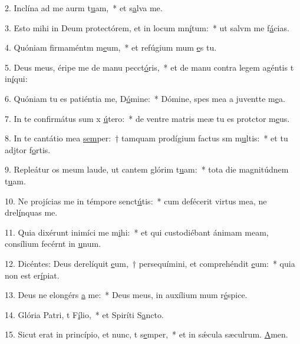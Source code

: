 2. Inclína ad me aurm t\uline{u}am,~* et s\uline{a}lva me.\par 
3. Esto mihi in Deum protectórem, et in locum mn\uline{í}tum:~* ut salvm me f\uline{á}cias.\par 
4. Quóniam firmaméntm m\uline{e}um,~* et refúgium mum \uline{e}s tu.\par 
5. Deus meus, éripe me de manu pecct\uline{ó}ris,~* et de manu contra legem agéntis t in\uline{í}qui:\par 
6. Quóniam tu es patiéntia me, D\uline{ó}mine:~* Dómine, spes mea a juventte m\uline{e}a.\par 
7. In te confirmátus sum x \uline{ú}tero:~* de ventre matris meæ tu es protctor m\uline{e}us.\par 
8. In te cantátio mea \uline{sem}per:~† tamquam prodígium factus sm m\uline{u}ltis:~* et tu adjtor f\uline{o}rtis.\par 
9. Repleátur os meum laude, ut cantem glórim t\uline{u}am:~* tota die magnitúdnem t\uline{u}am.\par 
10. Ne projícias me in témpore senct\uline{ú}tis:~* cum defécerit virtus mea, ne drel\uline{í}nquas me.\par 
11. Quia dixérunt inimíci me m\uline{i}hi:~* et qui custodiébant ánimam meam, consílium fecérnt in \uline{u}num.\par 
12. Dicéntes: Deus derelíquit \uline{e}um,~† persequímini, et comprehéndit \uline{e}um:~* quia non est  er\uline{í}piat.\par 
13. Deus ne elongérs \uline{a} me:~* Deus meus, in auxílium mum r\uline{é}spice.\par 
14. Glória Patri, t F\uline{í}lio,~* et Spiríti S\uline{a}ncto.\par 
15. Sicut erat in princípio, et nunc, t s\uline{e}mper,~* et in sǽcula sæculrum. \uline{A}men.\par 
